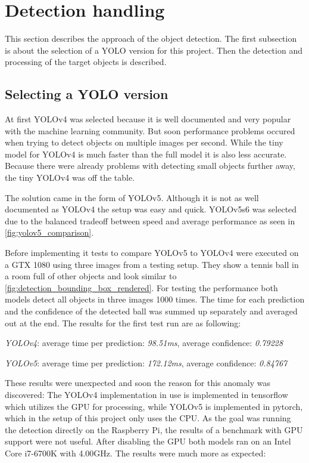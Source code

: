 \section{Detection handling}

This section describes the approach of the object detection. The first subsection is about the selection of a \ac{YOLO} version for this project. Then the detection and processing of the target objects is described.

\subsection{Selecting a YOLO version}

At first YOLOv4 was selected because it is well documented and very popular with the machine learning community. But soon  performance problems occured when trying to detect objects on multiple images per second. While the tiny model for YOLOv4 is much faster than the full model it is also less accurate. Because there were already problems with detecting small objects further away, the tiny YOLOv4 was off the table.

The solution came in the form of YOLOv5. Although it is not as well documented as YOLOv4 the setup was easy and quick. YOLOv5s6 was selected due to the balanced tradeoff between speed and average performance as seen in \autoref{fig:yolov5_comparison}. 

Before implementing it tests to compare YOLOv5 to YOLOv4 were executed on a GTX 1080 using three images from a testing setup. They show a tennis ball in a room full of other objects and look similar to \autoref{fig:detection_bounding_box_rendered}. For testing the performance both models detect all objects in three images 1000 times. The time for each prediction and the confidence of the detected ball was summed up separately and averaged out at the end. The results for the first test run are as following:

\textit{YOLOv4}: average time per prediction:   \textit{98.51ms}, average confidence: \textit{0.79228}

\textit{YOLOv5}: average time per prediction: \textit{172.12ms}, average confidence: \textit{0.84767}

These results were unexpected and soon the reason for this anomaly was discovered: The YOLOv4 implementation in use is implemented in tensorflow which utilizes the GPU for processing, while YOLOv5 is implemented in pytorch, which in the setup of this project only uses the CPU. As the goal was running the detection directly on the Raspberry Pi, the results of a benchmark with GPU support were not useful. After disabling the GPU both models ran on an Intel Core i7-6700K with 4.00GHz. The results were much more as expected:

